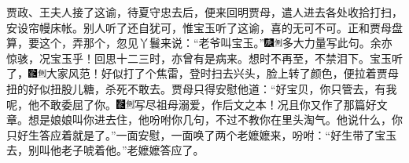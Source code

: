 贾政、王夫人接了这谕，待夏守忠去后，便来回明贾母，遣人进去各处收拾打扫，安设帘幔床帐。别人听了还自犹可，惟宝玉听了这谕，喜的无可不可。正和贾母盘算，要这个，弄那个，忽见丫鬟来说：“老爷叫宝玉。”{\includegraphics[width=3mm]{../Images/00004}\includegraphics[width=3mm]{../Images/00011}\footnotesize \kaishu 多大力量写此句。余亦惊骇，况宝玉乎！回思十二三时，亦曾有是病来。想时不再至，不禁泪下。}宝玉听了，{\includegraphics[width=3mm]{../Images/00006}\includegraphics[width=3mm]{../Images/00011}\footnotesize \kaishu 大家风范！}好似打了个焦雷，登时扫去兴头，脸上转了颜色，便拉着贾母扭的好似扭股儿糖，杀死不敢去。贾母只得安慰他道：“好宝贝，你只管去，有我呢，他不敢委屈了你。{\includegraphics[width=3mm]{../Images/00006}\includegraphics[width=3mm]{../Images/00011}\footnotesize \kaishu 写尽祖母溺爱，作后文之本！}况且你又作了那篇好文章。想是娘娘叫你进去住，他吩咐你几句，不过不教你在里头淘气。他说什么，你只好生答应着就是了。”一面安慰，一面唤了两个老嬷嬷来，吩咐：“好生带了宝玉去，别叫他老子唬着他。”老嬷嬷答应了。

